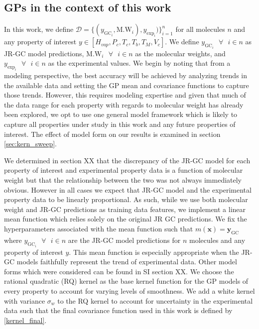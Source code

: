 \documentclass[journal=jacsat,manuscript=article]{achemso}
\newcommand{\xvec}{\ensuremath{\mathbf{x}}}
\newcommand{\Ygc}[1][]{\ensuremath{y_{\text{GC}_{#1}}}}
\newcommand{\Ygcvec}[1][]{\ensuremath{\mathbf{y}_{\text{GC}_{#1}}}}
\newcommand{\yexp}[1][]{\ensuremath{y_{\text{exp}_{#1}}}}
\begin{document}
\subsection{GPs in the context of this work}
In this work, we define $\mathcal{D} = \{(\Ygc[i], \text{M.W}_i), \yexp[i])\}_{i=1}^n$ for all molecules $n$ and any property of interest $y \in [H_{vap}, P_c, T_c, T_b ,T_M, V_c]$. We define $\Ygc[i] \text{ } \forall \text{ } i\in n$ as JR-GC model predictions, $\text{M.W}_i \text{ } \forall \text{ } i\in n$ as the molecular weights, and $\yexp[i] \text{ } \forall \text{ } i\in n$ as the experimental values. We begin by noting that from a modeling perspective, the best accuracy will be achieved by analyzing trends in the available data and setting the GP mean and covariance functions to capture those trends. However, this requires modeling expertise and given that much of the data range for each property with regards to molecular weight has already been explored, we opt to use one general model framework which is likely to capture all properties under study in this work and any future properties of interest. The effect of model form on our results is examined in section \ref{sec:kern_sweep}.

We determined in section XX that the discrepancy of the JR-GC model for each property of interest and experimental property data is a function of molecular weight but that the relationship between the two was not always immediately obvious. However in all cases we expect that JR-GC model and the experimental property data to be linearly proportional. As such, while we use both molecular weight and JR-GC predictions as training data features, we implement a linear mean function which relies solely on the original JR GC predictions. We fix the hyperparameters associated with the mean function such that $m(\xvec) = \Ygcvec$ where $\Ygc[i] \text{ } \forall \text{ } i\in n$ are the JR-GC model predictions for $n$ molecules and any property of interest $y$. This mean function is especially appropriate when the JR-GC models faithfully represent the trend of experimental data. Other model forms which were considered can be found in SI section XX. We choose the rational quadratic (RQ) kernel as the base kernel function for the GP models of every property to account for varying levels of smoothness. We add a white kernel with variance $\sigma_w$ to the RQ kernel to account for uncertainty in the experimental data such that the final covariance function used in this work is defined by \eqref{kernel_final}. 
\end{document}
